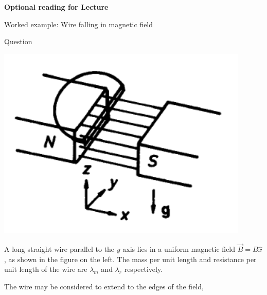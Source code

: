 \begin{frame}[plain,c]
\begin{center}
{\Huge \bf Optional reading for Lecture \thislecture}
\end{center}
\end{frame}


%
%

{
\problemslide

%
%
%

\begin{frame}{Worked example: Wire falling in magnetic field}

  \begin{blockexmplque}{Question}
    \begin{minipage}[l]{0.22\textwidth}
     \begin{center}
         \includegraphics[width=0.90\textwidth]{./images/problems/lect08_wire_falls_in_b_field}
     \end{center}
    \end{minipage}
    \begin{minipage}[r]{0.75\textwidth}
       A long straight wire parallel to the $y$ axis lies in a uniform magnetic
       field $\vec{B} = B \hat{x}$, as shown in the figure on the left.
       The mass per unit length and resistance per unit length of the wire
       are $\lambda_{m}$ and $\lambda_{r}$ respectively.\\
    \end{minipage}
    \vspace{0.1cm}
    The wire may be considered to extend to the edges of the field,

\end{blockexmplque}
\end{frame}}
